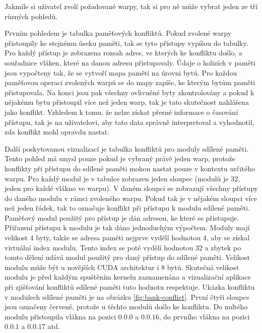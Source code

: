 
Jakmile si uživatel zvolí požadované warpy, tak si pro ně může vybrat jeden ze tří různých pohledů.

Prvním pohledem je tabulka paměťových konfliktů. Pokud zvolené warpy přistoupily ke stejnému úseku paměti, tak se tyto přístupy vypíšou do tabulky. Pro každý přístup je zobrazena rozsah adres, ve kterých ke konfliktu došlo, a souřadnice vláken, které na danou adresu přistupovaly. Údaje o kolizích v paměti jsou vypočteny tak, že se vytvoří mapa paměti na úrovni bytů. Pro každou paměťovou operaci zvolených warpů se do mapy zapíše, ke kterým bytům paměti přistupovala. Na konci jsou pak všechny ovlivněné byty zkontrolovány a pokud k nějakému bytu přistoupil více než jeden warp, tak je tato skutečnost nahlášena jako konflikt. Vzhledem k tomu, že nelze získat přesné informace o časování přístupu, tak je na uživatelovi, aby tato data správně interpretoval a vyhodnotil, zda konflikt mohl opravdu nastat.

Další poskytovanou vizualizací je tabulka konfliktů pro moduly sdílené paměti. Tento pohled má smysl pouze pokud je vybraný právě jeden warp, protože konflikty při přístupu do sdílené paměti mohou nastat pouze v kontextu určitého warpu. Pro každý modul je v tabulce zobrazen jeden sloupec (modulů je 32, jeden pro každé vlákno ve warpu). V daném sloupci se zobrazují všechny přístupy do daného modulu v rámci zvoleného warpu. Pokud tak je v nějakém sloupci více než jeden řádek, tak to označuje konflikt při přístupu k modulu sdílené paměti. Paměťový modul použitý pro přístup je dán adresou, ke které se přistupuje. Přiřazení přístupu k modulu je tak dáno jednoduchým výpočtem. Moduly mají velikost 4 byty, takže se adresa paměti nejprve vydělí hodnotou 4, aby se získal virtuální index modulu. Tento index se poté vydělí hodnotou 32 a zbytek po tomto dělení udává modul použitý pro daný přístup do sdílené paměti. Velikost modulu může být u novějších CUDA architektur i 8 bytů. Skutečná velikost modulu je před každým spuštěním kernelu zaznamenána a vizualizační aplikace při zjišťování konfliktů sdílené paměti tuto hodnotu respektuje. Ukázka konfliktu v modulech sdílené paměti je na obrázku \ref{fig:bank-conflict}. První čtyři sloupce jsou označeny červeně, protože u těchto modulů došlo ke konfliktu. Do nultého modulu přistoupila vlákna na pozici $0.0.0$ a $0.0.16$, do prvního vlákna na pozici $0.0.1$ a $0.0.17$ atd.


